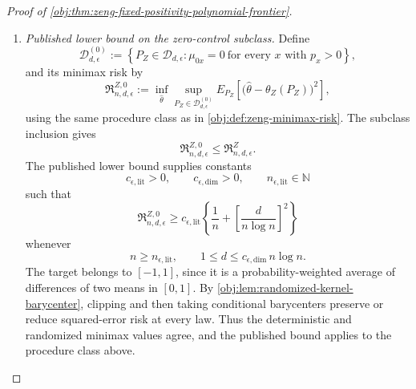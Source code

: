 \begin{proof}[Proof of \cref{obj:thm:zeng-fixed-positivity-polynomial-frontier}]
\begin{enumerate}
The mixed-count estimator takes values in \([-1,1]\), by its clipped
output and averaging construction in \cref{obj:def:mixed-count-estimator}.
Hence, for every sample,
\[
-2^n
\le
\sum_{\mathbf u\in\{0,1\}^n}
\widehat\tau^{\mathrm{mix}}_{n,d,\epsilon}
\bigl(o_1(u_1),\ldots,o_n(u_n)\bigr)
\le2^n,
\]
so
\[
-1\le
\widehat\theta^{\mathrm{poly}}_{n,d,\epsilon}(\mathbf z)
\le1.
\]
This finite-sample map is measurable and is an admissible deterministic
procedure in \cref{obj:def:zeng-minimax-risk}. The defining infimum and
the preceding bounds therefore give
\[
\begin{split}
\mathfrak R^Z_{n,d,\epsilon}
&\le
\sup_{P_Z\in\mathcal D_{d,\epsilon}}
E_{P_Z}\!\left[
\left(
\widehat\theta^{\mathrm{poly}}_{n,d,\epsilon}(\mathbf Z_n)
-\theta_Z(P_Z)
\right)^2
\right]\\
&\le \overline C\,r_{n,d,\epsilon}
\le C_{\epsilon,\mathrm{up}}\,r^{\mathrm{fix}}_{n,d},
\qquad
C_{\epsilon,\mathrm{up}}
:=
\overline C\,\gamma_{\epsilon,\mathrm{cmp}}^2>0.
\end{split}
\]

\item \textit{Published lower bound on the zero-control subclass.}
Define
\[
\mathcal D^{(0)}_{d,\epsilon}
:=
\left\{
P_Z\in\mathcal D_{d,\epsilon}:
\mu_{0x}=0\ \text{for every }x\text{ with }p_x>0
\right\},
\]
and its minimax risk by
\[
\mathfrak R^{Z,0}_{n,d,\epsilon}
:=
\inf_{\widehat\theta}
\sup_{P_Z\in\mathcal D^{(0)}_{d,\epsilon}}
E_{P_Z}\!\left[
\bigl(\widehat\theta-\theta_Z(P_Z)\bigr)^2
\right],
\]
using the same procedure class as in
\cref{obj:def:zeng-minimax-risk}. The subclass inclusion gives
\[
\mathfrak R^{Z,0}_{n,d,\epsilon}
\le
\mathfrak R^Z_{n,d,\epsilon}.
\]
The published lower bound
\citep[Theorem~2, Section~3.2, p.~9, and its zero-control construction
in Section~C.5, pp.~39--44]{ZengBalakrishnanHanKennedy2026}
supplies constants
\[
c_{\epsilon,\mathrm{lit}}>0,
\qquad
c_{\epsilon,\mathrm{dim}}>0,
\qquad
n_{\epsilon,\mathrm{lit}}\in\mathbb N
\]
such that
\[
\mathfrak R^{Z,0}_{n,d,\epsilon}
\ge
c_{\epsilon,\mathrm{lit}}
\left\{
\frac1n+\left[\frac d{n\log n}\right]^2
\right\}
\]
whenever
\[
n\ge n_{\epsilon,\mathrm{lit}},
\qquad
1\le d\le c_{\epsilon,\mathrm{dim}}\,n\log n.
\]
The target belongs to \([-1,1]\), since it is a probability-weighted
average of differences of two means in \([0,1]\). By
\cref{obj:lem:randomized-kernel-barycenter}, clipping and then taking
conditional barycenters preserve or reduce squared-error risk at
every law. Thus the deterministic and randomized minimax values agree,
and the published bound applies to the procedure class above.


\end{enumerate}
\end{proof}
